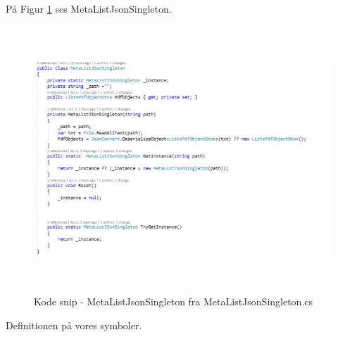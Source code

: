 På Figur \ref{fig:Singleton} ses MetaListJsonSingleton.
\begin{figure}[H] %
	\centering
	\includegraphics[height=10cm, width=14cm]{../ArkitekturDesign/Design/RegisterPDF/Singleton}
	\caption{Kode snip - MetaListJsonSingleton fra MetaListJsonSingleton.cs }
	\label{fig:Singleton}
\end{figure}
Definitionen på vores symboler.

\clearpage

